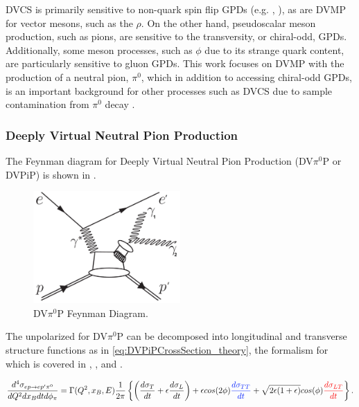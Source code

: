         DVCS is primarily sensitive to non-quark spin flip GPDs (e.g. \GPDH, \GPDE), as are DVMP for vector mesons, such as the $\rho$. On the other hand, pseudoscalar meson production, such as pions, are sensitive to the transversity, or chiral-odd, GPDs. Additionally, some meson processes, such as $\phi$ due to its strange quark content, are particularly sensitive to gluon GPDs. This work focuses on DVMP with the production of a neutral pion, $\pi^0$, which in addition to accessing chiral-odd GPDs, is an important background for other processes such as DVCS due to sample contamination from $\pi^0$ decay \parencite{Lee2022MeasurementDetector}.
        
        \subsubsection*{Deeply Virtual Neutral Pion Production}
            The Feynman diagram for Deeply Virtual Neutral Pion Production (DV$\pi^0$P or DVPiP) is shown in . 

            \begin{figure}[H]
                \centering
                \includegraphics[width=0.5\textwidth]{Chapters/Ch1-Intro/Ch1-Sec2-GPDs-DVMP/pics/dvPiP_Feynman_diagram_2.jpg}
                \caption[DVPiP Feynman Diagram]{DV$\pi^0$P Feynman Diagram.}
                \label{fig:DVPiP_diagram}
            \end{figure}

            The unpolarized \xsec for DV$\pi^0$P can be decomposed into longitudinal and transverse structure functions as in \eqref{eq:DVPiPCrossSection_theory}, the formalism for which is covered in \parencite{Donnachie1978GeneralizedDominance}, \parencite{Dreschsel1992ThresholdNucleons}, and \parencite{Donnelly2023GeneralResponses}. 
            
 
            \begin{equation}\labelAndRemember{eq:DVPiPCrossSection_theory}
                   {\frac{d^4\sigma_{ep \rightarrow ep'\pi^0}}{dQ^2dx_Bdtd\phi_{\pi}} =
                 \Gamma (Q^2, x_B, E)
                 \frac{1}{2\pi}
                 \left\{ \left(  \textcolor{sigmaT}{\frac{d\sigma_T}{dt}}+\epsilon  \textcolor{sigmaL}{\frac{d\sigma_L}{dt}} \right)+
                 \epsilon cos(2\phi)  \textcolor{sigmaTT}{\frac{d\sigma_{TT}}{dt}} + 
                 \sqrt{2\epsilon(1+\epsilon)} cos(\phi)  \textcolor{sigmaLT}{\frac{d\sigma_{LT}}{dt}} \right\}}.
             \end{equation}      

